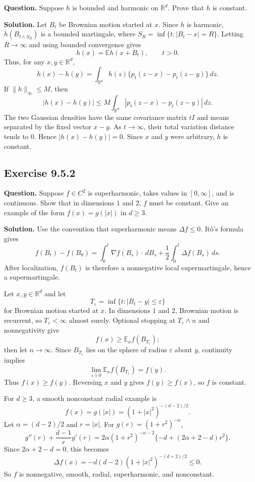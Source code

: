 \documentclass[11pt]{article}
\newcommand{\R}{\mathbb{R}}
\newcommand{\E}{\mathbb{E}}
\newcommand{\dd}{\,d}
\newcommand{\Del}{\Delta}
\begin{document}
\noindent\textbf{Question.}
Suppose $h$ is bounded and harmonic on $\R^d$.  Prove that $h$ is
constant.

\noindent\textbf{Solution.}
Let $B_t$ be Brownian motion started at $x$.  Since $h$ is harmonic,
$h(B_{t\wedge S_R})$ is a bounded martingale, where
$S_R=\inf\{t:|B_t-x|=R\}$.  Letting $R\to\infty$ and using bounded
convergence gives
\[
  h(x)=\E h(x+B_t),\qquad t>0.
\]
Thus, for any $x,y\in\R^d$,
\[
  h(x)-h(y)
  =
  \int_{\R^d} h(z)\{p_t(z-x)-p_t(z-y)\}\dd z.
\]
If $\|h\|_\infty\le M$, then
\[
  |h(x)-h(y)|
  \le
  M\int_{\R^d}|p_t(z-x)-p_t(z-y)|\dd z.
\]
The two Gaussian densities have the same covariance matrix $tI$ and
means separated by the fixed vector $x-y$.  As $t\to\infty$, their
total variation distance tends to $0$.  Hence $|h(x)-h(y)|=0$.
Since $x$ and $y$ were arbitrary, $h$ is constant.

\subsection*{Exercise 9.5.2}

\noindent\textbf{Question.}
Suppose $f\in C^2$ is superharmonic, takes values in $[0,\infty]$, and
is continuous.  Show that in dimensions $1$ and $2$, $f$ must be
constant.  Give an example of the form $f(x)=g(|x|)$ in $d\ge3$.

\noindent\textbf{Solution.}
Use the convention that superharmonic means $\Del f\le0$.  It\^o's
formula gives
\[
  f(B_t)-f(B_0)
  =
  \int_0^t \nabla f(B_s)\cdot\dd B_s
  +
  \frac12\int_0^t \Del f(B_s)\dd s.
\]
After localization, $f(B_t)$ is therefore a nonnegative local
supermartingale, hence a supermartingale.

Let $x,y\in\R^d$ and let
\[
  T_\varepsilon=\inf\{t:|B_t-y|\le\varepsilon\}
\]
for Brownian motion started at $x$.  In dimensions $1$ and $2$,
Brownian motion is recurrent, so $T_\varepsilon<\infty$ almost surely.
Optional stopping at $T_\varepsilon\wedge n$ and nonnegativity give
\[
  f(x)\ge \E_x f(B_{T_\varepsilon}); 
\]
then let $n\to\infty$.  Since $B_{T_\varepsilon}$ lies on the sphere
of radius $\varepsilon$ about $y$, continuity implies
\[
  \lim_{\varepsilon\downarrow0}\E_x f(B_{T_\varepsilon})=f(y).
\]
Thus $f(x)\ge f(y)$.  Reversing $x$ and $y$ gives $f(y)\ge f(x)$, so
$f$ is constant.

For $d\ge3$, a smooth nonconstant radial example is
\[
  f(x)=g(|x|)
  =
  (1+|x|^2)^{-(d-2)/2}.
\]
Let $\alpha=(d-2)/2$ and $r=|x|$.  For $g(r)=(1+r^2)^{-\alpha}$,
\[
  g''(r)+\frac{d-1}{r}g'(r)
  =
  2\alpha(1+r^2)^{-\alpha-2}
  \{-d+(2\alpha+2-d)r^2\}.
\]
Since $2\alpha+2-d=0$, this becomes
\[
  \Del f(x)
  =
  -d(d-2)(1+|x|^2)^{-(d+2)/2}\le0.
\]
So $f$ is nonnegative, smooth, radial, superharmonic, and nonconstant.
\end{document}
